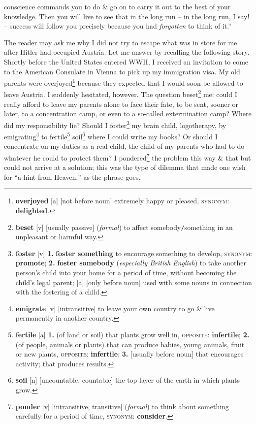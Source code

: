 \documentclass[oneside]{book}
\numberwithin{equation}{section}
\begin{document}
conscience commands you to do \& go on to carry it out to the best of your knowledge. Then you will live to see that in the long run -- in the long run, I say! -- success will follow you precisely because you had \textit{forgotten} to think of it.''

The reader may ask me why I did not try to escape what was in store for me after Hitler had occupied Austria. Let me answer by recalling the following story. Shortly before the United States entered WWII, I received an invitation to come to the American Consulate in Vienna to pick up my immigration visa. My old parents were overjoyed\footnote{\textbf{overjoyed} [a] [not before noun] extremely happy or pleased, \textsc{synonym}: \textbf{delighted}.} because they expected that I would soon be allowed to leave Austria. I suddenly hesitated, however. The question beset\footnote{\textbf{beset} [v] [usually passive] (\textit{formal}) to affect somebody\texttt{/}something in an unpleasant or harmful way.} me: could I really afford to leave my parents alone to face their fate, to be sent, sooner or later, to a concentration camp, or even to a so-called extermination camp? Where did my responsibility lie? Should I foster\footnote{\textbf{foster} [v] \textbf{1.} \textbf{foster something} to encourage something to develop, \textsc{synonym}: \textbf{promote}; \textbf{2.} \textbf{foster somebody} (\textit{especially British English}) to take another person's child into your home for a period of time, without becoming the child's legal parent; [a] [only before noun] used with some nouns in connection with the fostering of a child.} my brain child, logotherapy, by emigrating\footnote{\textbf{emigrate} [v] [intransitive] to leave your own country to go \& live permanently in another country.} to fertile\footnote{\textbf{fertile} [a] \textbf{1.} (of land or soil) that plants grow well in, \textsc{opposite}: \textbf{infertile}; \textbf{2.} (of people, animals or plants) that can produce babies, young animals, fruit or new plants, \textsc{opposite}: \textbf{infertile}; \textbf{3.} [usually before noun] that encourages activity; that produces results.} soil\footnote{\textbf{soil} [n] [uncountable, countable] the top layer of the earth in which plants grow.} where I could write my books? Or should I concentrate on my duties as a real child, the child of my parents who had to do whatever he could to protect them? I pondered\footnote{\textbf{ponder} [v] [intransitive, transitive] (\textit{formal}) to think about something carefully for a period of time, \textsc{synonym}: \textbf{consider}.} the problem this way \& that but could not arrive at a solution; this was the type of dilemma that made one wish for ``a hint from Heaven,'' as the phrase goes.
\end{document}
